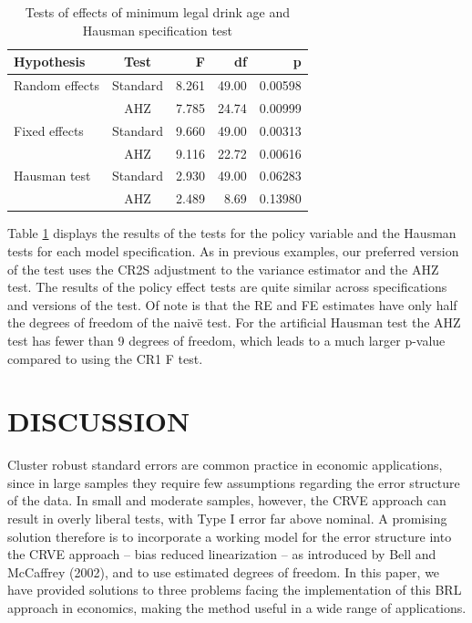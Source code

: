 \documentclass[12pt]{article}\usepackage[]{graphicx}\usepackage[]{color}
\begin{document}
\begin{table}[bth]
\centering
\begin{tabular}{lcrrr}
  \toprule
Hypothesis & Test & F & df & p \\ 
  \midrule
Random effects & Standard & 8.261 & 49.00 & 0.00598 \\ 
   & AHZ & 7.785 & 24.74 & 0.00999 \\ 
  Fixed effects & Standard & 9.660 & 49.00 & 0.00313 \\ 
   & AHZ & 9.116 & 22.72 & 0.00616 \\ 
   \midrule
Hausman test & Standard & 2.930 & 49.00 & 0.06283 \\ 
   & AHZ & 2.489 & 8.69 & 0.13980 \\ 
   \bottomrule
\end{tabular}
\caption{Tests of effects of minimum legal drink age and Hausman specification test} 
\label{tab:MLDA}
\end{table}


Table \ref{tab:MLDA} displays the results of the tests for the policy variable and the Hausman tests for each model specification. 
As in previous examples, our preferred version of the test uses the CR2S adjustment to the variance estimator and the AHZ test. 
The results of the policy effect tests are quite similar across specifications and versions of the test. 
Of note is that the RE and FE estimates have only half the degrees of freedom of the naiv\"e test. 
For the artificial Hausman test the AHZ test has fewer than 9 degrees of freedom, which leads to a much larger p-value compared to using the CR1 F test. 

\section{DISCUSSION}
\label{sec:discussion}

Cluster robust standard errors are common practice in economic applications, since in large samples they require few assumptions regarding the error structure of the data.
In small and moderate samples, however, the CRVE approach can result in overly liberal tests, with Type I error far above nominal.
A promising solution therefore is to incorporate a working model for the error structure into the CRVE approach -- bias reduced linearization -- as introduced by Bell and McCaffrey (2002), and to use estimated degrees of freedom.
In this paper, we have provided solutions to three problems facing the implementation of this BRL approach in economics, making the method useful in a wide range of applications.
\end{document}
